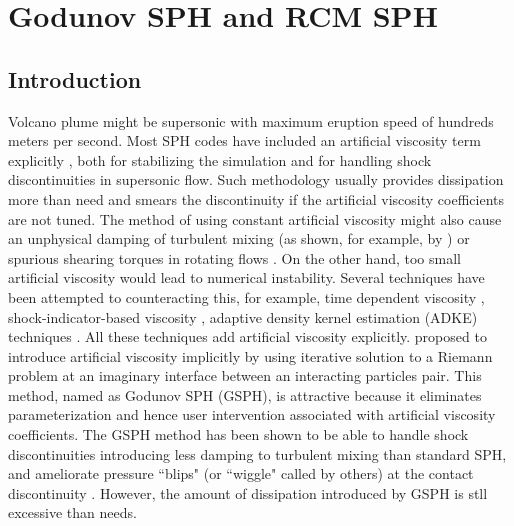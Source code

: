 \chapter{Godunov SPH and RCM SPH} \label{chapter:GSPH-RSPH}

\section{Introduction}
Volcano plume might be supersonic with maximum eruption speed of hundreds meters per second.
Most SPH codes have included an artificial viscosity term explicitly \citep{monaghan1983shock, monaghan1997sph, klapp2012strong}, both for stabilizing the simulation and for handling shock discontinuities in supersonic flow. Such methodology usually provides dissipation more than need and smears the discontinuity if the artificial viscosity coefficients are not tuned. The method of using constant artificial viscosity might also cause an unphysical damping of turbulent mixing (as shown, for example, by \citet{borgani2012hydrodynamic}) or spurious shearing torques in rotating flows \citep{flebbe1994smoothed}. On the other hand, too small artificial viscosity would lead to numerical instability. Several techniques have been attempted to counteracting this, for example, time dependent viscosity \citep{morris1997switch, dolag2005turbulent}, shock-indicator-based viscosity \citep{cullen2010inviscid}, adaptive density kernel estimation (ADKE) techniques \citep{sigalotti2008adaptive}. All these techniques add artificial viscosity explicitly.  \citet{inutsuka2002reformulation} proposed to introduce artificial viscosity implicitly by using iterative solution to a Riemann problem at an imaginary interface between an interacting particles pair. This method, named as Godunov SPH (GSPH), is attractive because it eliminates parameterization and hence user intervention associated with artificial viscosity coefficients. The GSPH method has been shown to be able to handle shock discontinuities \citep{inutsuka2002reformulation, cha2003implementations,iwasaki2011smoothed, puri2014approximate} introducing less damping to turbulent mixing \citep{cha2010kelvin, borgani2012hydrodynamic} than standard SPH, and ameliorate pressure ``blips" (or ``wiggle" called by others) at the contact discontinuity \citep{borgani2012hydrodynamic}. However, the amount of dissipation introduced by GSPH is stll excessive than needs.

